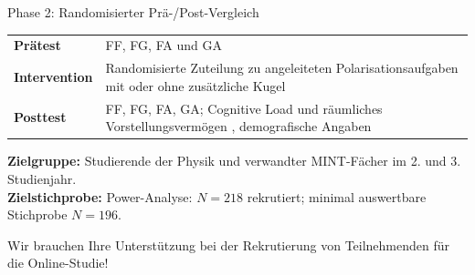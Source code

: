 \begin{frame}{Phase 2: Randomisierter Prä-/Post-Vergleich}
\begin{tabularx}{\textwidth}{@{}P{.18\textwidth}Y@{}}
\toprule
\textbf{Prätest} & FF, FG, FA und GA\\
\textbf{Intervention} & Randomisierte Zuteilung zu angeleiteten Polarisationsaufgaben mit oder ohne zusätzliche Kugel\\
\textbf{Posttest} & FF, FG, FA, GA; Cognitive Load \citep{krieglstein2023} und räumliches Vorstellungsvermögen \citep{young2025}, demografische Angaben\\
\bottomrule
\end{tabularx}\par
\vspace{3mm}
\textbf{Zielgruppe:} Studierende der Physik und verwandter MINT-Fächer im 2. und 3. Studienjahr.\\[2mm]
\textbf{Zielstichprobe:} Power-Analyse: $N=218$ rekrutiert; minimal auswertbare Stichprobe $N=196$.

Wir brauchen Ihre Unterstützung bei der Rekrutierung von Teilnehmenden für die Online-Studie!
\end{frame}

